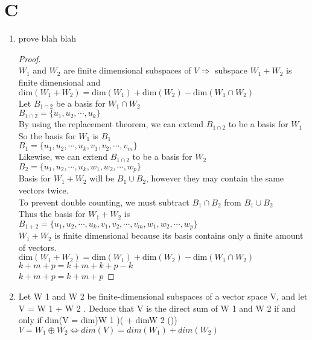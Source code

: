 \documentclass[11pt]{scrartcl}
\begin{document}
\section{C}
\begin{enumerate}[label=\alph*.]
	\item{
			prove blah blah
			\begin{proof}
			\-\\
			$W_1$ and $W_2$ are finite dimensional subspaces of $V \Rightarrow $ subspace $W_1 + W_2$ is finite dimensional and $\text{dim}(W_1 + W_2) = \text{dim}(W_1) + \text{dim}(W_2) - \text{dim}(W_1 \cap W_2)$\\
			Let $B_{1\cap 2}$ be a basis for $W_1 \cap W_2$\\
			$B_{1\cap 2} = \{u_1, u_2, \cdots, u_k\}$\\
			By using the replacement theorem, we can extend $B_{1\cap 2}$ to be a basis for $W_1$\\
			So the basis for $W_1$ is $B_1$\\
			$B_1 = \{u_1, u_2, \cdots, u_k, v_1, v_2, \cdots, v_m\}$\\
			Likewise, we can extend $B_{1\cap 2}$ to be a basis for $W_2$\\
			$B_2 = \{u_1, u_2, \cdots, u_k, w_1, w_2, \cdots, w_p\}$\\
			Basis for $W_1 + W_2$ will be $B_1 \cup B_2$, however they may contain the same vectors twice.\\
			To prevent double counting, we must subtract $B_1 \cap B_2$ from $B_1 \cup B_2$\\
			Thus the basis for $W_1 + W_2$ is\\
			$B_{1+2} = \{u_1, u_2, \cdots, u_k, v_1, v_2, \cdots, v_m, w_1, w_2, \cdots, w_p\}$\\
			$W_1 + W_2$ is finite dimensional because its basis contains only a finite amount of vectors. \\
			$\text{dim}(W_1 + W_2) = \text{dim}(W_1) + \text{dim}(W_2) - \text{dim}(W_1 \cap W_2)$\\
			$k + m + p = k + m + k + p - k$\\
			$k + m + p = k + m + p$
			\end{proof}
		}
	\item{
			Let W 1 and W 2 be finite-dimensional subspaces of a vector space V, and let V = W 1 + W 2 . Deduce that V
			is the direct sum of W 1 and W 2 if and only if dim(V = dim)W 1 )( + dimW 2 ())\\
			$V = W_1 \oplus W_2 \Leftrightarrow dim(V) = dim(W_1) + dim(W_2)$
}
\end{enumerate}
\end{document}
